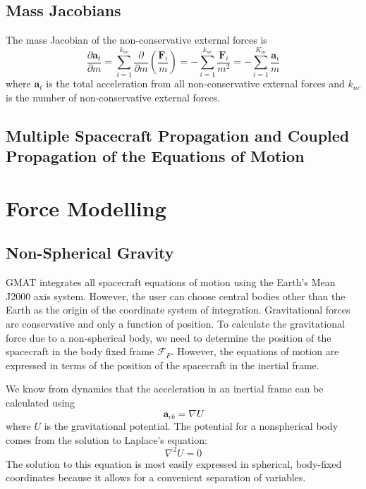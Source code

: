 \subsection{Mass Jacobians}

The mass Jacobian of the non-conservative external forces is
%
\begin{equation}
\frac{\partial\mathbf{a}_{t} }{\partial m} =  \sum_{i=1}^{k_{nc}} \frac{\partial}{\partial m}\left( \frac{\mathbf{F}_i}{ m} \right) =  -\sum_{i=1}^{k_{nc}} \frac{\mathbf{F}_i}{ m^2}   = -\sum_{i=1}^{K_{nc}} \frac{\mathbf{a}_i}{ m}
\end{equation}
%
where $\mathbf{a}_{t}$ is the total acceleration from all non-conservative external forces and $k_{nc}$ is the number of non-conservative external forces.

\subsection{Multiple Spacecraft Propagation and Coupled Propagation of the Equations of Motion}

\section{Force Modelling}



\subsection{Non-Spherical Gravity }

GMAT integrates all spacecraft equations of motion using the
Earth's Mean J2000 axis system. However, the user can choose
central bodies other than the Earth as the origin of the
coordinate system of integration.  Gravitational forces are
conservative and only a function of position.  To calculate the
gravitational force due to a non-spherical body, we need to
determine the position of the spacecraft in the body fixed frame
$\mathcal{F}_F$.  However, the equations of motion are expressed
in terms of the position of the spacecraft in the inertial frame.

We know from dynamics that the acceleration in an inertial frame
can be calculated using
%
\begin{equation}
   \mathbf{a}_{cb} = \nabla U \label{Eq:a_cb}
\end{equation}
%
where $U$ is the gravitational potential.  The potential for a
nonspherical body comes from the solution to Laplace's equation:
%
\begin{equation}
     \nabla^2 U= 0
\end{equation}
%
The solution to this equation is most easily expressed in spherical,
body-fixed coordinates because it allows for a convenient separation
of variables.

